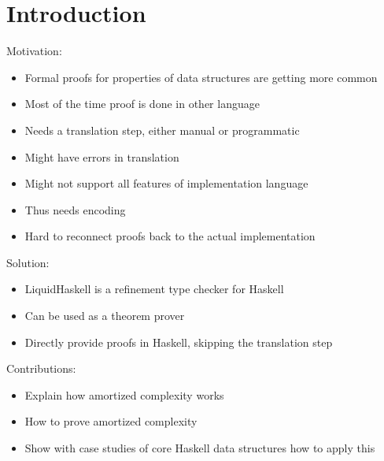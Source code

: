 \documentclass[sigplan,screen]{acmart}
\begin{document}

\maketitle

\section{Introduction}

Motivation:
\begin{itemize}
\item{Formal proofs for properties of data structures are getting more common}
\item{Most of the time proof is done in other language}
\item{Needs a translation step, either manual or programmatic}
\item{Might have errors in translation}
\item{Might not support all features of implementation language}
\item{Thus needs encoding}
\item{Hard to reconnect proofs back to the actual implementation}
\end{itemize}

Solution:
\begin{itemize}
\item{LiquidHaskell \cite{liquidhaskell} is a refinement type \cite{refinement_types} checker for Haskell}
\item{Can be used as a theorem prover \cite{tpfa}}
\item{Directly provide proofs in Haskell, skipping the translation step}
\end{itemize}

Contributions:
\begin{itemize}
\item{Explain how amortized complexity works}
\item{How to prove amortized complexity}
\item{Show with case studies of core Haskell data structures how to apply this}
\end{itemize}
\end{document}
